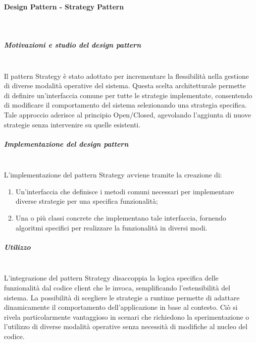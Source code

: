 \documentclass[10pt]{article}
\newcommand{\myparagraph}[1]{\paragraph{#1}\mbox{}\\}
\newcommand{\mysubparagraph}[1]{\subparagraph{#1}\mbox{}\\}
\begin{document}
    \myparagraph{Design Pattern - Strategy Pattern}

    \mysubparagraph{Motivazioni e studio del design pattern}
    Il pattern Strategy è stato adottato per incrementare la flessibilità nella gestione di diverse modalità operative del sistema. Questa scelta architetturale permette di definire un'interfaccia comune per tutte le strategie implementate, consentendo di modificare il comportamento del sistema selezionando una strategia specifica. Tale approccio aderisce al principio Open/Closed, agevolando l'aggiunta di nuove strategie senza intervenire su quelle esistenti.

    \mysubparagraph{Implementazione del design pattern}
    L’implementazione del pattern Strategy avviene tramite la creazione di:
    \begin{enumerate}
        \item Un'interfaccia che definisce i metodi comuni necessari per implementare diverse strategie per una specifica funzionalità;
        \item Una o più classi concrete che implementano tale interfaccia, fornendo algoritmi specifici per realizzare la funzionalità in diversi modi.
    \end{enumerate}

    \mysubparagraph{Utilizzo}
    L'integrazione del pattern Strategy disaccoppia la logica specifica delle funzionalità dal codice client che le invoca, semplificando l'estensibilità del sistema. La possibilità di scegliere le strategie a runtime permette di adattare dinamicamente il comportamento dell'applicazione in base al contesto. Ciò si rivela particolarmente vantaggioso in scenari che richiedono la sperimentazione o l'utilizzo di diverse modalità operative senza necessità di modifiche al nucleo del codice.
\end{document}
